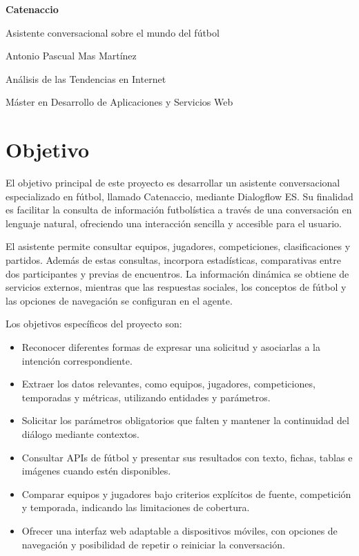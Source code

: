 \documentclass[11pt,a4paper]{article}
\begin{document}
\begin{titlepage}
\centering
\vspace*{3cm}
{\Huge\bfseries Catenaccio\par}
\vspace{0.8cm}
{\Large Asistente conversacional sobre el mundo del fútbol\par}
\vspace{2cm}
{\large Antonio Pascual Mas Martínez\par}
\vfill
Análisis de las Tendencias en Internet\par
\vspace{0.4cm}
Máster en Desarrollo de Aplicaciones y Servicios Web\par
\vspace*{2cm}
\end{titlepage}

\tableofcontents
\newpage

\section{Objetivo}

El objetivo principal de este proyecto es desarrollar un asistente conversacional especializado en fútbol, llamado Catenaccio, mediante Dialogflow ES. Su finalidad es facilitar la consulta de información futbolística a través de una conversación en lenguaje natural, ofreciendo una interacción sencilla y accesible para el usuario.

El asistente permite consultar equipos, jugadores, competiciones, clasificaciones y partidos. Además de estas consultas, incorpora estadísticas, comparativas entre dos participantes y previas de encuentros. La información dinámica se obtiene de servicios externos, mientras que las respuestas sociales, los conceptos de fútbol y las opciones de navegación se configuran en el agente.

Los objetivos específicos del proyecto son:
\begin{itemize}
\item Reconocer diferentes formas de expresar una solicitud y asociarlas a la intención correspondiente.
\item Extraer los datos relevantes, como equipos, jugadores, competiciones, temporadas y métricas, utilizando entidades y parámetros.
\item Solicitar los parámetros obligatorios que falten y mantener la continuidad del diálogo mediante contextos.
\item Consultar APIs de fútbol y presentar sus resultados con texto, fichas, tablas e imágenes cuando estén disponibles.
\item Comparar equipos y jugadores bajo criterios explícitos de fuente, competición y temporada, indicando las limitaciones de cobertura.
\item Ofrecer una interfaz web adaptable a dispositivos móviles, con opciones de navegación y posibilidad de repetir o reiniciar la conversación.
\end{itemize}
\end{document}
